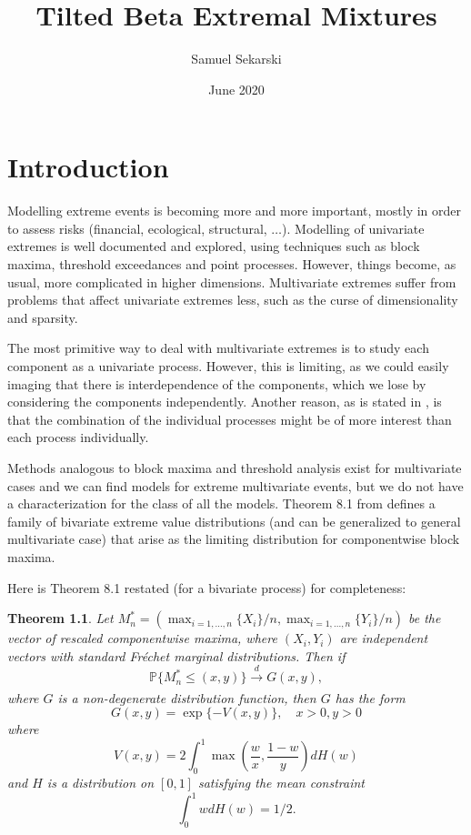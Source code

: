 \documentclass[10pt]{report}
\title{Tilted Beta Extremal Mixtures}
\author{Samuel Sekarski}
\date{June 2020}
\newtheorem{theorem}{Theorem}
\begin{document}
\maketitle



\tableofcontents
\listoffigures

\chapter{Introduction}
\label{sec:intro}

Modelling extreme events is becoming more and more important, mostly in order to assess risks (financial, ecological, structural, $\ldots$). Modelling of univariate extremes is well documented and explored, using techniques such as block maxima, threshold exceedances and point processes.
However, things become, as usual, more complicated in higher dimensions. Multivariate extremes suffer from problems that affect univariate extremes less, such as the curse of dimensionality and sparsity.

The most primitive way to deal with multivariate extremes is to study each component as a univariate process. However, this is limiting, as we could easily imaging that there is interdependence of the components, which we lose by considering the components independently. Another reason, as is stated in \cite{Coles}, is that the combination of the individual processes might be of more interest than each process individually.

Methods analogous to block maxima and threshold analysis exist for multivariate cases and we can find models for extreme multivariate events, but we do not have a characterization for the class of all the models. Theorem 8.1 from \cite{Coles} defines a family of bivariate extreme value distributions (and can be generalized to general multivariate case) that arise as the limiting distribution for componentwise block maxima. 

Here is Theorem 8.1 restated (for a bivariate process) for completeness:

\begin{theorem}

Let $M^*_n = (\max_{i=1,...,n} \{X_i\}/n, \max_{i=1,...,n} \{Y_i\}/n)$ be the vector of rescaled componentwise maxima, where $(X_i,Y_i)$ are independent vectors with standard Fréchet marginal distributions. Then if
$$
\mathbb{P}\{M^*_n \leq (x,y) \} \xrightarrow[]{d} G(x,y),
$$
where $G$ is a non-degenerate distribution function, then $G$ has the form
$$
G(x,y) = \exp\{-V(x,y)\}, \quad x>0, y>0
$$
where
$$
V(x,y) = 2 \int^1_0 \max \left(\frac{w}{x},\frac{1-w}{y}\right)dH(w)
$$
and $H$ is a distribution on $[0,1]$ satisfying the mean constraint
$$
\int_0^1 wdH(w) = 1/2.
$$


\end{theorem}
\end{document}

